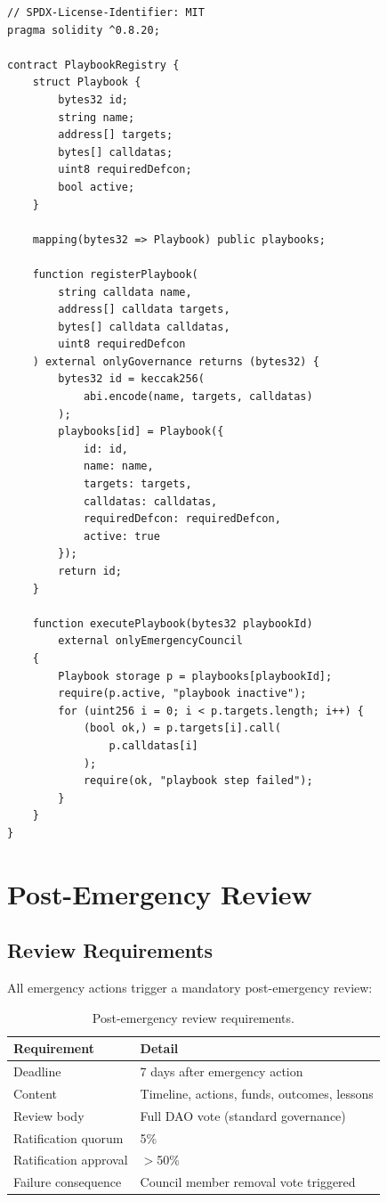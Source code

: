 \documentclass[11pt,letterpaper]{article}
\begin{document}
\begin{lstlisting}[language=Solidity,caption=Playbook registry]
// SPDX-License-Identifier: MIT
pragma solidity ^0.8.20;

contract PlaybookRegistry {
    struct Playbook {
        bytes32 id;
        string name;
        address[] targets;
        bytes[] calldatas;
        uint8 requiredDefcon;
        bool active;
    }

    mapping(bytes32 => Playbook) public playbooks;

    function registerPlaybook(
        string calldata name,
        address[] calldata targets,
        bytes[] calldata calldatas,
        uint8 requiredDefcon
    ) external onlyGovernance returns (bytes32) {
        bytes32 id = keccak256(
            abi.encode(name, targets, calldatas)
        );
        playbooks[id] = Playbook({
            id: id,
            name: name,
            targets: targets,
            calldatas: calldatas,
            requiredDefcon: requiredDefcon,
            active: true
        });
        return id;
    }

    function executePlaybook(bytes32 playbookId)
        external onlyEmergencyCouncil
    {
        Playbook storage p = playbooks[playbookId];
        require(p.active, "playbook inactive");
        for (uint256 i = 0; i < p.targets.length; i++) {
            (bool ok,) = p.targets[i].call(
                p.calldatas[i]
            );
            require(ok, "playbook step failed");
        }
    }
}
\end{lstlisting}

\section{Post-Emergency Review}
\label{sec:review}

\subsection{Review Requirements}

All emergency actions trigger a mandatory post-emergency review:

\begin{table}[h]
\centering
\caption{Post-emergency review requirements.}
\label{tab:review}
\begin{tabular}{ll}
\toprule
\textbf{Requirement} & \textbf{Detail} \\
\midrule
Deadline & 7 days after emergency action \\
Content & Timeline, actions, funds, outcomes, lessons \\
Review body & Full DAO vote (standard governance) \\
Ratification quorum & 5\% \\
Ratification approval & $>$50\% \\
Failure consequence & Council member removal vote triggered \\
\bottomrule
\end{tabular}
\end{table}
\end{document}
